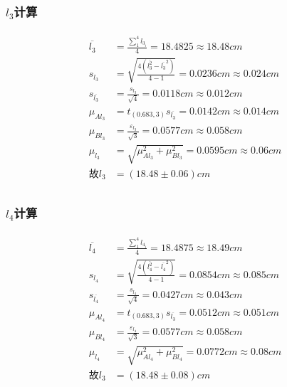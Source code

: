 \documentclass[12pt,a4paper,UTF8]{ctexart}
\begin{document}
\subsubsection*{$l_3$计算}
\begin{align*}
	\begin{aligned}
	\overline{l_3}&=\frac{\sum_{1}^{4}l_{3_i}}{4}=18.4825\approx 18.48cm\\
	s_{l_{3}}&=\sqrt{\frac{4(\overline{l_3^2}-\overline{l_3}^2)}{4-1}}=0.0236cm\approx 0.024cm\\
	s_{\overline{l_{3}}} &= \frac{s_{l_{3}}}{\sqrt{4}} = 0.0118cm\approx 0.012cm\\
	\mu_{Al_3} &= t_{(0.683,3)}s_{\overline{l_3}} = 0.0142cm\approx0.014cm\\
	\mu_{Bl_3} &= \frac{\varepsilon_{l_3}}{\sqrt{3}} = 0.0577cm \approx 0.058cm\\
	\mu_{l_3} &= \sqrt{\mu_{Al_3}^2+\mu_{Bl_3}^2}=0.0595cm\approx 0.06cm\\
	\text{故}l_3 &= (18.48 \pm 0.06)cm \\
	\end{aligned}
\end{align*}
\subsubsection*{$l_4$计算}
\begin{align*}
	\begin{aligned}
	\overline{l_4}&=\frac{\sum_{1}^{4}l_{4_i}}{4}=18.4875\approx 18.49cm\\
	s_{l_{4}}&=\sqrt{\frac{4(\overline{l_4^2}-\overline{l_4}^2)}{4-1}}=0.0854cm\approx 0.085cm\\
	s_{\overline{l_{4}}} &= \frac{s_{l_{4}}}{\sqrt{4}} = 0.0427cm\approx 0.043cm\\
	\mu_{Al_4} &= t_{(0.683,3)}s_{\overline{l_3}} = 0.0512cm\approx0.051cm\\
	\mu_{Bl_4} &= \frac{\varepsilon_{l_4}}{\sqrt{3}} = 0.0577cm \approx 0.058cm\\
	\mu_{l_4} &= \sqrt{\mu_{Al_4}^2+\mu_{Bl_4}^2}=0.0772cm\approx 0.08cm\\
	\text{故}l_3 &= (18.48 \pm 0.08)cm \\
	\end{aligned}
\end{align*}
\end{document}
